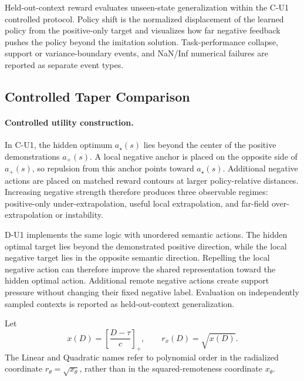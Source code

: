 \documentclass{article}
\theoremstyle{plain}
\theoremstyle{definition}
\theoremstyle{remark}
\begin{document}
Held-out-context reward evaluates unseen-state generalization within the
C-U1 controlled protocol. Policy shift is the normalized displacement of
the learned policy from the positive-only target and visualizes how far
negative feedback pushes the policy beyond the imitation solution.
Task-performance collapse, support or variance-boundary events, and
NaN/Inf numerical failures are reported as separate event types.


\subsection{Controlled Taper Comparison}
\label{app:controlled_taper_protocol}

\paragraph{Controlled utility construction.}
In C-U1, the hidden optimum $a_\star(s)$ lies beyond the center of the
positive demonstrations $a_+(s)$. A local negative anchor is placed on
the opposite side of $a_+(s)$, so repulsion from this anchor points
toward $a_\star(s)$. Additional negative actions are placed on matched
reward contours at larger policy-relative distances. Increasing
negative strength therefore produces three observable regimes:
positive-only under-extrapolation, useful local extrapolation, and
far-field over-extrapolation or instability.

D-U1 implements the same logic with unordered semantic actions. The
hidden optimal target lies beyond the demonstrated positive direction,
while the local negative target lies in the opposite semantic
direction. Repelling the local negative action can therefore improve
the shared representation toward the hidden optimal action. Additional
remote negative actions create support pressure without changing their
fixed negative label. Evaluation on independently sampled contexts is
reported as held-out-context generalization.

Let
\[
x(D)
=
\left[
\frac{D-\tau}{c}
\right]_{+},
\qquad
r_x(D)=\sqrt{x(D)}.
\]
The Linear and Quadratic names refer to polynomial order in the
radialized coordinate \(r_\theta=\sqrt{x_\theta}\), rather than in the
squared-remoteness coordinate \(x_\theta\).
\end{document}
